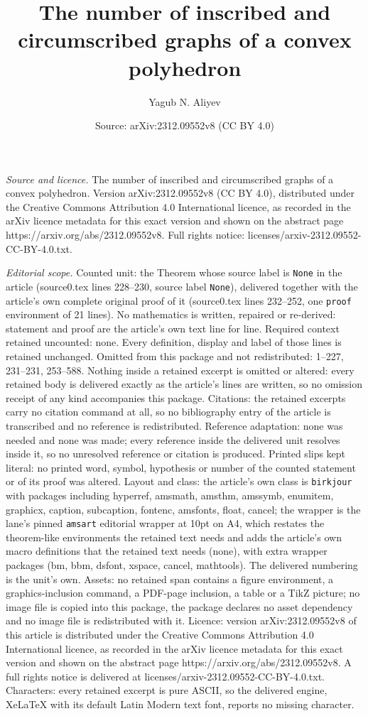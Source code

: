 \documentclass[10pt,a4paper]{amsart}
\title[The number of inscribed and circumscribed graphs of a convex]{The number of inscribed and circumscribed graphs of a convex polyhedron}
\author{Yagub N. Aliyev}
\date{Source: arXiv:2312.09552v8 (CC BY 4.0)}
\begin{document}
\maketitle

\noindent\emph{Source and licence.} The number of inscribed and circumscribed graphs of a convex polyhedron. Version arXiv:2312.09552v8 (CC BY 4.0), distributed under the Creative Commons Attribution 4.0 International licence, as recorded in the arXiv licence metadata for this exact version and shown on the abstract page https://arxiv.org/abs/2312.09552v8. Full rights notice: licenses/arxiv-2312.09552-CC-BY-4.0.txt.\par\smallskip

\noindent\textit{Editorial scope.} Counted unit: the Theorem whose source label is \texttt{None} in the article (source0.tex lines 228--230, source label \texttt{None}), delivered together with the article's own complete original proof of it (source0.tex lines 232--252, one \texttt{proof} environment of 21 lines). No mathematics is written, repaired or re-derived: statement and proof are the article's own text line for line. Required context retained uncounted: none. Every definition, display and label of those lines is retained unchanged. Omitted from this package and not redistributed: 1--227, 231--231, 253--588. Nothing inside a retained excerpt is omitted or altered: every retained body is delivered exactly as the article's lines are written, so no omission receipt of any kind accompanies this package. Citations: the retained excerpts carry no citation command at all, so no bibliography entry of the article is transcribed and no reference is redistributed. Reference adaptation: none was needed and none was made; every reference inside the delivered unit resolves inside it, so no unresolved reference or citation is produced. Printed slips kept literal: no printed word, symbol, hypothesis or number of the counted statement or of its proof was altered. Layout and class: the article's own class is \texttt{birkjour} with packages including hyperref, amsmath, amsthm, amssymb, enumitem, graphicx, caption, subcaption, fontenc, amsfonts, float, cancel; the wrapper is the lane's pinned \texttt{amsart} editorial wrapper at 10pt on A4, which restates the theorem-like environments the retained text needs and adds the article's own macro definitions that the retained text needs (none), with extra wrapper packages (bm, bbm, dsfont, xspace, cancel, mathtools). The delivered numbering is the unit's own. Assets: no retained span contains a figure environment, a graphics-inclusion command, a PDF-page inclusion, a table or a TikZ picture; no image file is copied into this package, the package declares no asset dependency and no image file is redistributed with it. Licence: version arXiv:2312.09552v8 of this article is distributed under the Creative Commons Attribution 4.0 International licence, as recorded in the arXiv licence metadata for this exact version and shown on the abstract page https://arxiv.org/abs/2312.09552v8. A full rights notice is delivered at licenses/arxiv-2312.09552-CC-BY-4.0.txt. Characters: every retained excerpt is pure ASCII, so the delivered engine, XeLaTeX with its default Latin Modern text font, reports no missing character.
\end{document}
